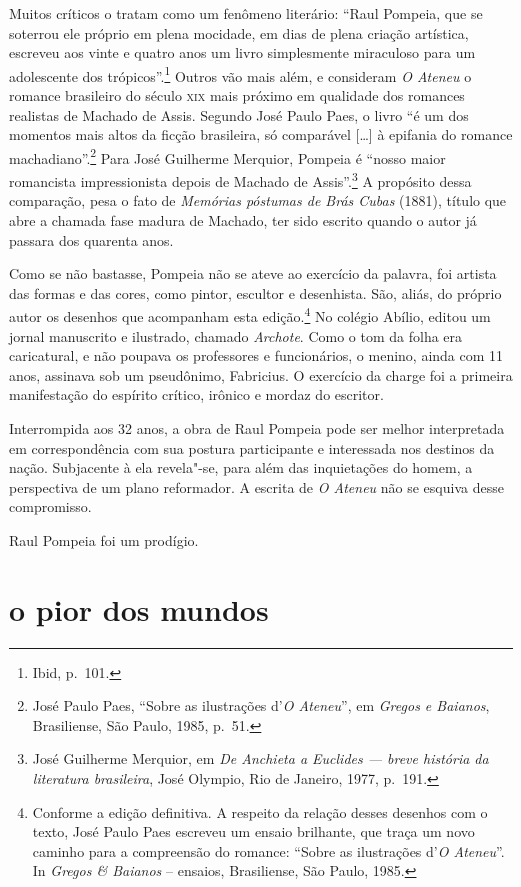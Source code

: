 Muitos críticos o tratam como um fenômeno literário:
``Raul Pompeia, que se soterrou ele próprio em plena mocidade, em dias
de plena criação artística, escreveu aos vinte e quatro anos um livro
simplesmente miraculoso para um adolescente dos trópicos''.\footnote{Ibid, p.~101.} 
Outros vão mais além, e consideram
\textit{O Ateneu} o romance brasileiro do
século \textsc{xix} mais próximo em qualidade dos romances realistas de Machado
de Assis. Segundo José Paulo Paes, o livro ``é um dos momentos mais
altos da ficção brasileira, só comparável [\ldots{}] à epifania do romance
machadiano''.\footnote{José Paulo Paes, ``Sobre as ilustrações
d'\textit{O Ateneu}'', em \textit{Gregos e Baianos}, Brasiliense, 
São Paulo, 1985, p.~51.} Para José Guilherme
Merquior, Pompeia é ``nosso maior romancista impressionista depois de
Machado de Assis''.\footnote{José Guilherme Merquior, em \textit{De
Anchieta a Euclides --- breve história da literatura brasileira}, José Olympio, 
Rio de Janeiro, 1977, p.~191.} A propósito
dessa comparação, pesa o fato de \textit{Memórias póstumas de
Brás Cubas} (1881), título que abre a chamada fase
madura de Machado, ter sido escrito quando o autor já passara dos
quarenta anos.


Como se não bastasse, Pompeia não se ateve ao exercício
da palavra, foi artista das formas e das cores, como pintor, escultor e
desenhista. São, aliás, do próprio autor os desenhos que acompanham
esta edição.\footnote{Conforme a edição definitiva. A respeito da
relação desses desenhos com o texto, José Paulo Paes escreveu um ensaio
brilhante, que traça um novo caminho para a compreensão do romance:
``Sobre as ilustrações d'\textit{O Ateneu}''. In \textit{Gregos \&
Baianos} -- ensaios, Brasiliense, São Paulo, 1985.} 
No colégio Abílio, editou um jornal manuscrito e
ilustrado, chamado \textit{Archote}. Como o
tom da folha era caricatural, e não poupava os professores e
funcionários, o menino, ainda com 11 anos, assinava sob um pseudônimo,
Fabricius. O exercício da charge foi a primeira manifestação do
espírito crítico, irônico e mordaz do escritor.


Interrompida aos 32 anos, a obra de Raul Pompeia pode
ser melhor interpretada em correspondência com sua postura participante
e interessada nos destinos da nação. Subjacente à ela revela"-se, para
além das inquietações do homem, a perspectiva de um plano reformador. A
escrita de \textit{O Ateneu} não se esquiva desse compromisso.

Raul Pompeia foi um prodígio. 


\section*{o pior dos mundos}

